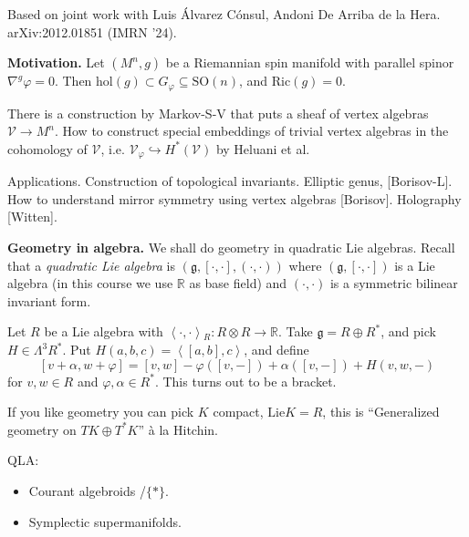 \medskip\noindent
Based on joint work with Luis Álvarez Cónsul,
Andoni De Arriba de la Hera. arXiv:2012.01851
(IMRN '24).

\medskip\noindent
{\bf Motivation.}
Let $(M^n,g)$ be a Riemannian spin manifold
with
parallel spinor $\nabla^g \varphi=0$.
Then $\text{hol}(g) \subset G_\varphi
\subseteq \text{SO}(n)$,
and $\text{Ric}(g)=0$.

There is a construction by Markov-S-V that
puts a sheaf
of vertex algebras $\mathcal{V} \to M^n$.
How to construct special embeddings of
trivial vertex algebras
in the cohomology of $\mathcal{V}$, i.e.
$\mathcal{V}_\varphi \hookrightarrow
H^*(\mathcal{V})$
by Heluani et al.

\medskip\noindent
Applications. Construction of topological
invariants.
Elliptic genus, [Borisov-L].
How to understand mirror symmetry using
vertex algebras [Borisov].
Holography [Witten].

\medskip\noindent
{\bf Geometry in algebra.}
We shall do geometry in quadratic Lie
algebras.
Recall that a {\it quadratic Lie algebra} is
 $(\mathfrak{g},[\cdot,\cdot],
 (\cdot,\cdot))$ where
$(\mathfrak{g},[\cdot,\cdot])$ is a Lie
algebra
(in this course we use $\mathbb{R}$ as base
field)
and $(\cdot,\cdot)$ is a symmetric bilinear
invariant form.

\begin{example}
\label{example-quadratic-Lie-algebra}
Let $R$ be a Lie algebra with
$\left\langle{}\cdot,\cdot\right\rangle{}_R: R \otimes R \to
\mathbb{R}$.
Take $\mathfrak{g}=R \oplus R^*$,
and pick $H \in \Lambda^{3}R^*$.
Put $H(a,b,c)=\left\langle{}[a,b],c\right\rangle{}$, and
define
$$
[v+\alpha,w+\varphi]=[v,w]-\varphi([v,-])+
\alpha([v,-])+H(v,w,-)
$$
for $v,w \in R$ and $\varphi,\alpha \in R
^*$. This turns out to be a bracket.

If you like geometry you can pick $K$
compact, $\text{Lie}K=R$,
this is ``Generalized geometry on $T K \oplus
T^* K$''
à la Hitchin.
\end{example}

\medskip\noindent
QLA:
\begin{itemize}
\item Courant algebroids /$\{*\}$.
\item  Symplectic supermanifolds.
\end{itemize}


